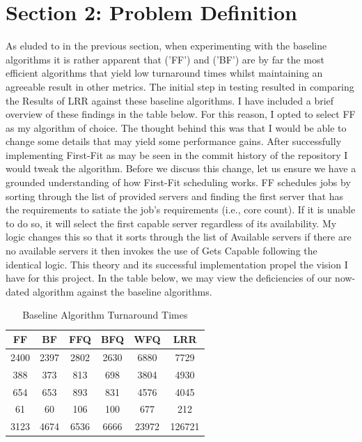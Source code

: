 \documentclass[a4paper]{article} %
\begin{document}
\section{Section 2: Problem Definition}
\label{sec:section2}
As eluded to in the previous section, when experimenting with the baseline algorithms it is rather apparent that \textbf{} ('FF') and \textbf{} ('BF') are by far the most efficient algorithms that yield low turnaround times whilst maintaining an agreeable result in other metrics. The initial step in testing resulted in comparing the Results of LRR against these baseline algorithms. I have included a brief overview of these findings in the table below. For this reason, I opted to select FF as my algorithm of choice. The thought behind this was that I would be able to change some details that may yield some performance gains. After successfully implementing First-Fit as may be seen in the commit history of the repository I would tweak the algorithm. Before we discuss this change, let us ensure we have a grounded understanding of how First-Fit scheduling works. FF schedules jobs by sorting through the list of provided servers and finding the first server that has the requirements to satiate the job's requirements (i.e., core count). If it is unable to do so, it will select the first capable server regardless of its availability. My logic changes this so that it sorts through the list of Available servers if there are no available servers it then invokes the use of Gets Capable following the identical logic. This theory and its successful implementation propel the vision I have for this project. In the table below, we may view the deficiencies of our now-dated algorithm against the baseline algorithms.   

\begin{table}[h!]
    \centering
    \begin{tabular}{|c|c|c|c|c|c|}
    \hline
        FF & BF & FFQ & BFQ & WFQ & LRR\\
    \hline
    2400 & 2397 & 2802 & 2630& 6880 & 7729\\\hline
    388 & 373  & 813 & 698 & 3804 & 4930\\\hline
    654 & 653 & 893 & 831 & 4576 & 4045\\\hline
    61 & 60 & 106 & 100 & 677 & 212\\\hline
    3123 & 4674 & 6536 & 6666& 23972& 126721\\\hline
    \end{tabular}
    \label{tab:my_label}
    \caption{Baseline Algorithm Turnaround Times}
\end{table}
\end{document}

